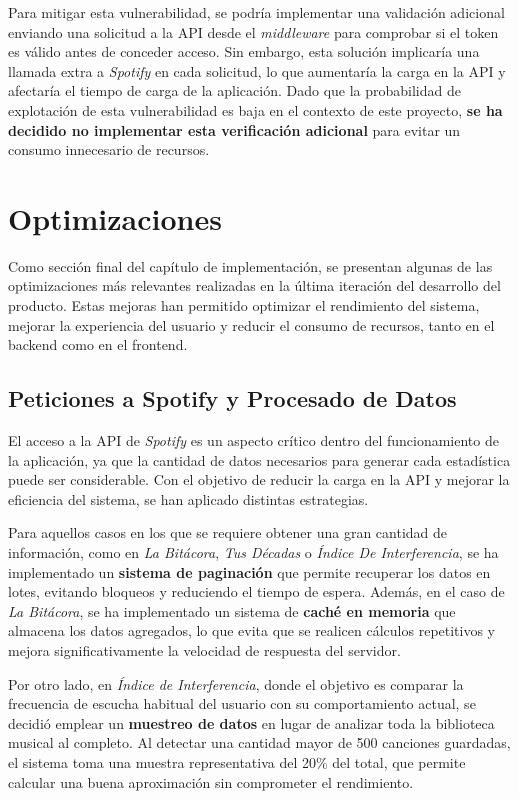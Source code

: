 Para mitigar esta vulnerabilidad, se podría implementar una validación adicional enviando una solicitud a la API desde el \textit{middleware} para comprobar si el token es válido antes de conceder acceso. Sin embargo, esta solución implicaría una llamada extra a \textit{Spotify} en cada solicitud, lo que aumentaría la carga en la API y afectaría el tiempo de carga de la aplicación. Dado que la probabilidad de explotación de esta vulnerabilidad es baja en el contexto de este proyecto, \textbf{se ha decidido no implementar esta verificación adicional} para evitar un consumo innecesario de recursos.

\section{Optimizaciones} \label{sec:optimizaciones}

Como sección final del capítulo de implementación, se presentan algunas de las optimizaciones más relevantes realizadas en la última iteración del desarrollo del producto. Estas mejoras han permitido optimizar el rendimiento del sistema, mejorar la experiencia del usuario y reducir el consumo de recursos, tanto en el backend como en el frontend.

\subsection{Peticiones a Spotify y Procesado de Datos}

El acceso a la API de \textit{Spotify} es un aspecto crítico dentro del funcionamiento de la aplicación, ya que la cantidad de datos necesarios para generar cada estadística puede ser considerable. Con el objetivo de reducir la carga en la API y mejorar la eficiencia del sistema, se han aplicado distintas estrategias.

Para aquellos casos en los que se requiere obtener una gran cantidad de información, como en \textit{La Bitácora}, \textit{Tus Décadas} o \textit{Índice De Interferencia}, se ha implementado un \textbf{sistema de paginación} que permite recuperar los datos en lotes, evitando bloqueos y reduciendo el tiempo de espera. Además, en el caso de \textit{La Bitácora}, se ha implementado un sistema de \textbf{caché en memoria} que almacena los datos agregados, lo que evita que se realicen cálculos repetitivos y mejora significativamente la velocidad de respuesta del servidor.

Por otro lado, en \textit{Índice de Interferencia}, donde el objetivo es comparar la frecuencia de escucha habitual del usuario con su comportamiento actual, se decidió emplear un \textbf{muestreo de datos} en lugar de analizar toda la biblioteca musical al completo. Al detectar una cantidad mayor de 500 canciones guardadas, el sistema toma una muestra representativa del 20\% del total, que permite calcular una buena aproximación sin comprometer el rendimiento.

